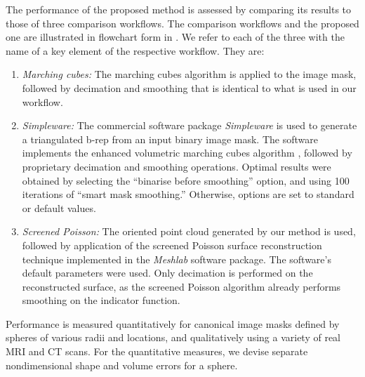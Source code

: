 The performance of the proposed method is assessed by comparing its results to those of three comparison workflows.  The comparison workflows and the proposed one are illustrated in flowchart form in .  We refer to each of the three with the name of a key element of the respective workflow.  They are:
\begin{enumerate}
\item  {\em Marching cubes:}  The marching cubes algorithm is applied to the image mask, followed by decimation and smoothing that is identical to what is used in our workflow.
\item  {\em Simpleware:}  The commercial software package {\em Simpleware} is used to generate a triangulated b-rep from an input binary image mask.  The software implements the enhanced volumetric marching cubes algorithm \cite{young_2008}, followed by proprietary decimation and smoothing operations.  Optimal results were obtained by selecting the ``binarise before smoothing'' option, and using 100 iterations of ``smart mask smoothing.''  Otherwise, options are set to standard or default values.
\item  {\em Screened Poisson:}  The oriented point cloud generated by our method is used, followed by application of the screened Poisson surface reconstruction technique \cite{kazhdan_2013} implemented in the \textit{Meshlab} software package.  The software's default parameters were used.  Only decimation is performed on the reconstructed surface, as the screened Poisson algorithm already performs smoothing on the indicator function.  
\end{enumerate}
Performance is measured quantitatively for canonical image masks defined by spheres of various radii and locations, and qualitatively using a variety of real MRI and CT scans.  For the quantitative measures, we devise separate nondimensional shape and volume errors for a sphere.  
